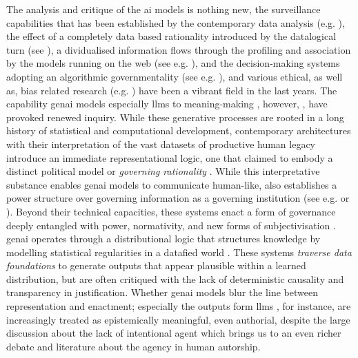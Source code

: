\greensquare
The analysis and critique of the \gls{ai} models is nothing new, the surveillance capabilities that has been established by the contemporary data
analysis (e.g. \cite{Krasmann2017}), the effect of a completely data based
rationality introduced by the datalogical turn (see \cite{Clough2015}), a
dividualised information flows through the profiling and association by the
models running on the web (see e.g. \cite{Cheney2011}), and the decision-making
systems adopting an algorithmic
governmentality (see e.g.
\cite{rouvroy2007}), and various ethical, as well as, bias related research
(e.g. \cite{kordzadeh2022}) have been a vibrant field in the last years. The
capability \gls{genai} models especially \glspl{llm} to meaning-making
\parencite[]{gretzky2024, mishra2024, dishon2024}, however, , have provoked
renewed inquiry. While these generative processes are rooted in a long history
of statistical and computational development, contemporary architectures with
their interpretation of the vast datasets of productive human legacy introduce
an immediate representational logic, one that claimed to embody a distinct political
model or \emph{governing rationality} \parencite[2]{amoore2024}. While this
interpretative substance
enables \gls{genai} models to communicate human-like, also establishes a power
structure over governing information as a governing institution (see e.g.
\cite{mackenzie2021} or \cite{dishon2024}). Beyond their technical capacities, these systems enact a form of governance deeply entangled with power, normativity, and new forms of subjectivisation \parencite{eloff2021}. \Gls{genai} operates through a distributional logic that structures knowledge by modelling statistical regularities in a datafied world \parencite{amoore2023}. These systems \textit{traverse data foundations} to generate outputs that appear plausible within a learned distribution, but are often critiqued with the lack of deterministic causality and transparency in justification. Whether \gls{genai} models blur the line between representation and enactment; especially the outputs form \glspl{llm} , for instance, are increasingly treated as epistemically meaningful, even authorial, despite the large discussion about the lack of intentional agent which brings us to an even richer debate and literature about the agency in human autorship.



